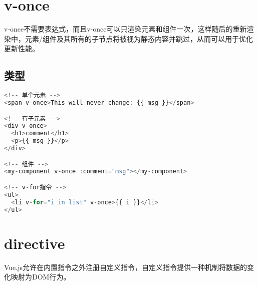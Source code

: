 \begin{lstlisting}[language=JavaScript]

\end{lstlisting}




\begin{lstlisting}[language=JavaScript]

\end{lstlisting}




\begin{lstlisting}[language=JavaScript]

\end{lstlisting}




\begin{lstlisting}[language=JavaScript]

\end{lstlisting}

\section{v-once}

v-once不需要表达式，而且v-once可以只渲染元素和组件一次，这样随后的重新渲染中，元素/组件及其所有的子节点将被视为静态内容并跳过，从而可以用于优化更新性能。

\subsection{类型}


\begin{lstlisting}[language=JavaScript]
<!-- 单个元素 -->
<span v-once>This will never change: {{ msg }}</span>

<!-- 有子元素 -->
<div v-once>
  <h1>comment</h1>
  <p>{{ msg }}</p>
</div>

<!-- 组件 -->
<my-component v-once :comment="msg"></my-component>

<!-- v-for指令 -->
<ul>
  <li v-for="i in list" v-once>{{ i }}</li>
</ul>
\end{lstlisting}

\section{directive}


Vue.js允许在内置指令之外注册自定义指令，自定义指令提供一种机制将数据的变化映射为DOM行为。


